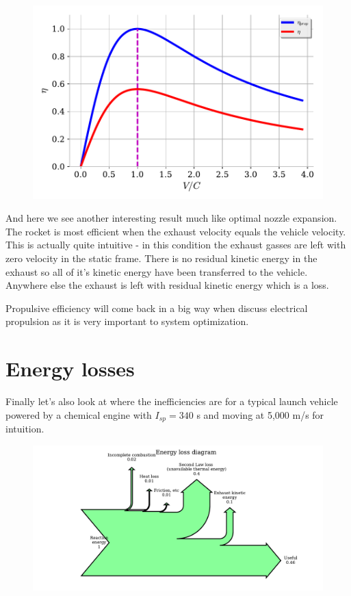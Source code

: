 \documentclass[twocolumn]{memoir} %
\begin{document}
\begin{figure}[H]
    \includegraphics[width=0.9\columnwidth]{prop_eff}
\end{figure}

    And here we see another interesting result much like optimal nozzle
expansion. The rocket is most efficient when the exhaust velocity equals
the vehicle velocity. This is actually quite intuitive - in this
condition the exhaust gasses are left with zero velocity in the static
frame. There is no residual kinetic energy in the exhaust so all of it's
kinetic energy have been transferred to the vehicle. Anywhere else the
exhaust is left with residual kinetic energy which is a loss.

Propulsive efficiency will come back in a big way when discuss electrical propulsion as it is very important to system optimization.

\section{Energy losses}\label{energy-losses}

Finally let's also look at where the inefficiencies are for a typical launch vehicle powered by a chemical engine with \(I_{sp} = 340\) s and moving at 5,000 m/s for intuition.

\begin{figure}[H]
    \includegraphics[width=0.9\columnwidth]{sankey}
\end{figure}
\end{document}
